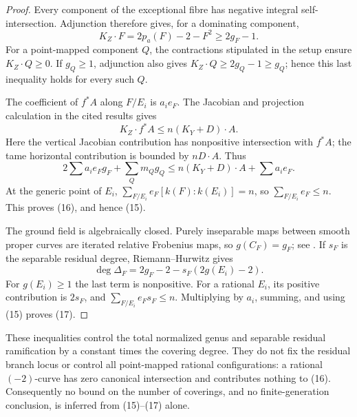 \begin{proof}
Every component of the exceptional fibre has negative integral
self-intersection. Adjunction therefore gives, for a dominating
component,
\[
 K_Z\cdot F=2p_a(F)-2-F^2\geq2g_F-1.
\]
For a point-mapped component $Q$, the contractions stipulated in
the setup ensure $K_Z\cdot Q\geq0$. If $g_Q\geq1$, adjunction
also gives $K_Z\cdot Q\geq2g_Q-1\geq g_Q$; hence this last
inequality holds for every such $Q$.

The coefficient of $f^*A$ along $F/E_i$ is $a_i e_F$.
The Jacobian and projection calculation in the cited results gives
\[
 K_Z\cdot f^*A\leq n(K_Y+D)\cdot A.
\]
Here the vertical Jacobian contribution has nonpositive
intersection with $f^*A$; the tame horizontal contribution is
bounded by $nD\cdot A$. Thus
\[
 2\sum a_i e_Fg_F+\sum_Qm_Qg_Q
 \leq n(K_Y+D)\cdot A+\sum a_i e_F.
\]
At the generic point of $E_i$,
$\sum_{F/E_i}e_F[k(F):k(E_i)]=n$, so
$\sum_{F/E_i}e_F\leq n$. This proves (16), and hence (15).

The ground field is algebraically closed. Purely inseparable maps
between smooth proper curves are iterated relative Frobenius maps,
so $g(C_F)=g_F$; see
\citep[Lemmas~53.13.4--53.13.5 and Proposition~53.13.7]{StacksResidualGenusB}.
If $s_F$ is the separable residual degree,
Riemann--Hurwitz \citep[Lemma~53.12.2]{StacksResidualGenusB} gives
\[
 \deg\Delta_F=2g_F-2-s_F(2g(E_i)-2).
\]
For $g(E_i)\geq1$ the last term is nonpositive. For a rational
$E_i$, its positive contribution is $2s_F$, and
$\sum_{F/E_i}e_Fs_F\leq n$. Multiplying by $a_i$, summing,
and using (15) proves (17).
\end{proof}

\begin{remark}
These inequalities control the total normalized genus and
separable residual ramification by a constant times the covering
degree. They do not fix the residual branch locus or control all
point-mapped rational configurations: a rational $(-2)$-curve
has zero canonical intersection and contributes nothing to
(16). Consequently no bound on the number of coverings, and no
finite-generation conclusion, is inferred from (15)--(17) alone.
\end{remark}
